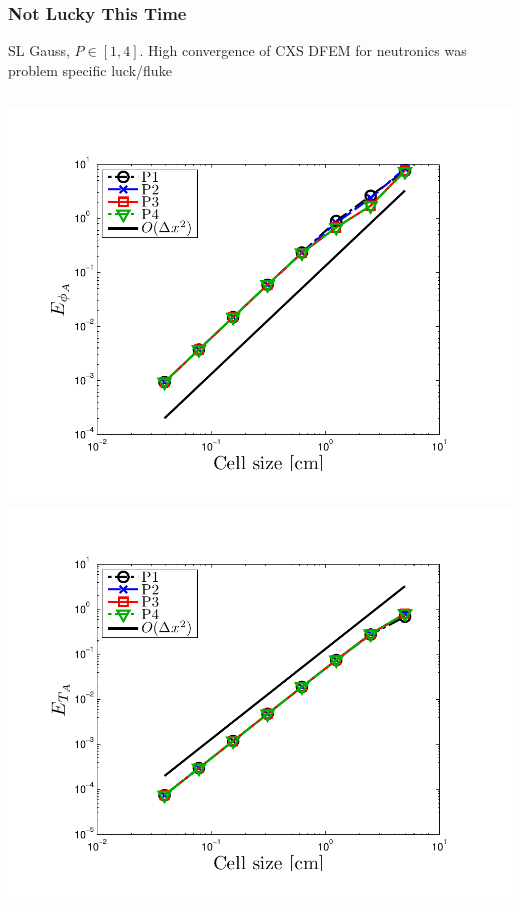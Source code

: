 \documentclass{beamer}
\begin{document}
\begin{frame}
\begin{columns}[t]
\end{columns}
\end{frame}

\begin{frame}
\frametitle{Not Lucky This Time}
SL Gauss, $P\in[1,4]$.  High convergence of CXS DFEM for neutronics was problem specific luck/fluke
\begin{columns}[t]
\centering
\includegraphics[width=\textwidth,trim=0.25in  0.2in 0.75in 0.5in,clip=true]{../chapter6_grey_radtran/Dissertation_Data/MMS3_Constant_XS_SL_Gauss_phi_A.pdf}
\centering
\includegraphics[width=\textwidth,trim=0.25in  0.2in 0.75in 0.5in,clip=true]{../chapter6_grey_radtran/Dissertation_Data/MMS3_Constant_XS_SL_Gauss_temp_A.pdf}
\end{columns}
\end{frame}
\end{document}
